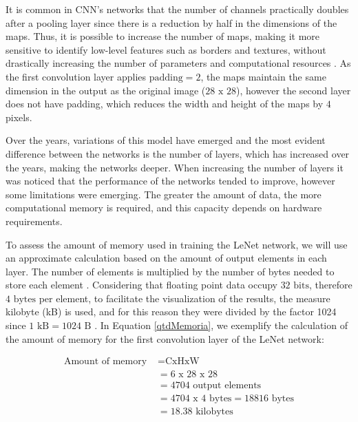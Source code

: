 It is common in CNN's networks that the number of channels practically doubles after a pooling layer since there is a reduction by half in the dimensions of the maps. Thus, it is possible to increase the number of maps, making it more sensitive to identify low-level features such as borders and textures, without drastically increasing the number of parameters and computational resources \cite{zhang2020dive}. As the first convolution layer applies  $\text{padding}=2$, the maps maintain the same dimension in the output as the original image ($28 \text{ x } 28$), however the second layer does not have padding, which reduces the width and height of the maps by $4$ pixels.

Over the years, variations of this model have emerged and the most evident difference between the networks is the number of layers, which has increased over the years, making the networks deeper. When increasing the number of layers it was noticed that the performance of the networks tended to improve, however some limitations were emerging. The greater the amount of data, the more computational memory is required, and this capacity depends on hardware requirements.

To assess the amount of memory used in training the LeNet network, we will use an approximate calculation based on the amount of output elements in each layer. The number of elements is multiplied by the number of bytes needed to store each element \cite{johnson2019}. Considering that floating point data occupy $32 \text{ bits}$, therefore  $4 \text{ bytes}$ per element, to facilitate the visualization of the results, the measure kilobyte (kB) is used, and for this reason they were divided by the factor 1024 since  $1 \text{ kB} = 1024 \text{ B}$ . In Equation \ref{qtdMemoria}, we exemplify the calculation of the amount of memory for the first convolution layer of the LeNet network:


\begin{equation}
\begin{split}
\text{Amount of memory }& = \text{CxHxW}\\ 
&= 6 \text{ x } 28 \text{ x } 28\\
&= 4704 \text{ output elements}\\
&= 4704 \text{ x }4 \text{ bytes} = 18816 \text{ bytes}\\
&= 18.38 \text{ kilobytes}
\end{split}
\label{qtdMemoria}
\end{equation}

